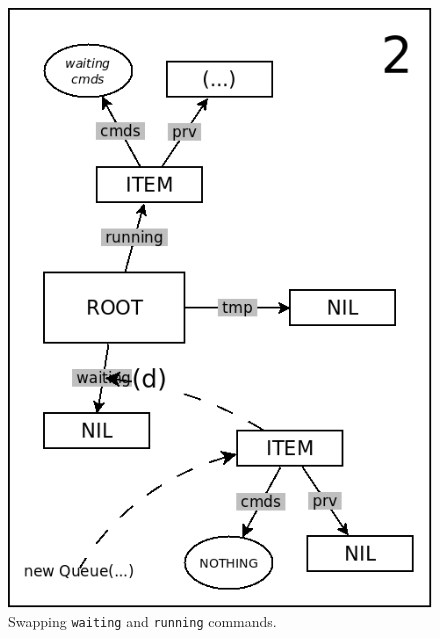 \documentclass{sig-alternate}
\newcommand{\code}[1] {{\small{\texttt{#1}}}}
\begin{document}
\begin{figure}
\begin{minipage}[t]{0.24\linewidth}
\includegraphics[scale=0.25]{queue-12.png}
\end{minipage}
\caption{
Swapping \code{waiting} and \code{running} commands.
\label{fig.queue-1}
}
\end{figure}
\end{document}
